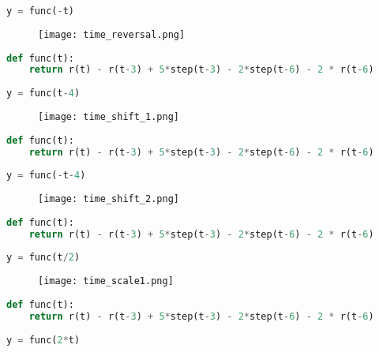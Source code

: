 \documentclass[12pt,a4paper]{article}
\begin{document}
\begin{itemize}
\begin{lstlisting}[language=Python, caption={Time reversal}, label={lst:code}, mathescape=true, breaklines=true]
y = func(-t)
\end{lstlisting}

\begin{figure}[h]
    \centering
    \texttt{[image: time\_reversal.png]}
\end{figure}\textbf{}

\begin{lstlisting}[language=Python, caption={Time Shift f(t-4)}, label={lst:code}, mathescape=true, breaklines=true]
def func(t):
    return r(t) - r(t-3) + 5*step(t-3) - 2*step(t-6) - 2 * r(t-6)
    
y = func(t-4)
\end{lstlisting}

\begin{figure}[h]
    \centering
    \texttt{[image: time\_shift\_1.png]}
\end{figure}\textbf{}

\begin{lstlisting}[language=Python, caption={Time Shift f(-t-4)}, label={lst:code}, mathescape=true, breaklines=true]
def func(t):
    return r(t) - r(t-3) + 5*step(t-3) - 2*step(t-6) - 2 * r(t-6)
    
y = func(-t-4)
\end{lstlisting}

\begin{figure}[h]
    \centering
    \texttt{[image: time\_shift\_2.png]}
\end{figure}\textbf{}

\begin{lstlisting}[language=Python, caption={Time scale f(t/2)}, label={lst:code}, mathescape=true, breaklines=true]
def func(t):
    return r(t) - r(t-3) + 5*step(t-3) - 2*step(t-6) - 2 * r(t-6)
    
y = func(t/2)
\end{lstlisting}

\begin{figure}[h]
    \centering
    \texttt{[image: time\_scale1.png]}
\end{figure}\textbf{}
\clearpage

\begin{lstlisting}[language=Python, caption={Time scale f(2t)}, label={lst:code}, mathescape=true, breaklines=true]
def func(t):
    return r(t) - r(t-3) + 5*step(t-3) - 2*step(t-6) - 2 * r(t-6)
    
y = func(2*t)
\end{lstlisting}


\end{itemize}
\end{document}
